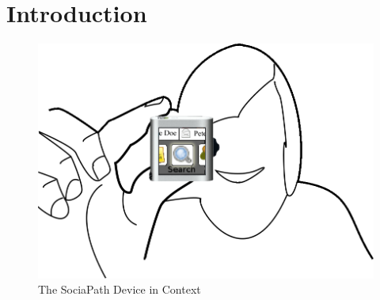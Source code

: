 %
%
%
\section{Introduction}

\begin{figure}[h]
  \begin{center}
    \includegraphics[width=0.8\linewidth]{imgs/main.png}
  \end{center}
  \caption{The SociaPath Device in Context}
  \label{fig:main}
\end{figure}

